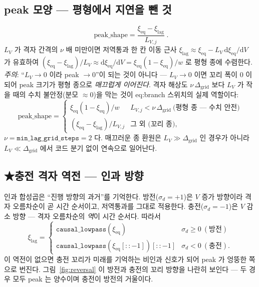 \documentclass[11pt,a4paper]{article}
\newcommand{\dd}{\mathrm{d}}
\newcommand{\eq}{\mathrm{eq}}
\newcommand{\code}[1]{\texttt{#1}}
\begin{document}
\subsection{peak 모양 — 평형에서 지연을 뺀 것}
\begin{equation}
\boxed{\;\text{peak\_shape}=\frac{\xi_{\eq}-\xi_{\mathrm{lag}}}{L_{V,j}}\;.}
\label{eq:peakshape}
\end{equation}
$L_V$ 가 격자 간격의 $\nu$ 배 미만이면 저역통과 한 칸 이동 근사
$\xi_\mathrm{lag}\approx\xi_\eq - L_V\,\dd\xi_\eq/\dd V$ 가 유효하여
$(\xi_\eq-\xi_\mathrm{lag})/L_V\approx\dd\xi_\eq/\dd V = \xi_\eq(1-\xi_\eq)/w$ 로 평형 종에 수렴한다.
\emph{주의}: ``$L_V\to0$ 이라 peak $\to0$''이 되는 것이 아니다 — $L_V\to0$ 이면 꼬리 폭이 $0$ 이 되어
peak 크기가 평형 종으로 \emph{매끄럽게 이어진다}. 격자 해상도 $\nu\,\Delta_\mathrm{grid}$ 보다
$L_V$ 가 작을 때의 수치 불안정(분모 $\approx0$)을 막는 것이 eq:branch 스위치의 실제 역할이다:
\begin{equation}
\text{peak\_shape}=
\begin{cases}
\xi_\eq(1-\xi_\eq)/w & L_{V,j}<\nu\,\Delta_\mathrm{grid}\ \text{(평형 종 — 수치 안전)}\\[2pt]
(\xi_\eq-\xi_\mathrm{lag})/L_{V,j} & \text{그 외 (꼬리 종)},
\end{cases}
\label{eq:branch}
\end{equation}
$\nu=\code{min\_lag\_grid\_steps}=2$ 다. 매끄러운 종 환원은 $L_V\gg\Delta_\mathrm{grid}$ 인 경우가 아니라
$L_V \ll \Delta_\mathrm{grid}$ 에서 코드 분기 없이 연속으로 일어난다.

\subsection{★충전 격자 역전 — 인과 방향}
인과 합성곱은 ``진행 방향의 과거''를 기억한다. 방전($\sigma_d=+1$)은 $V$ 증가 방향이라
격자 오름차순이 곧 시간 순서이고, 저역통과를 그대로 적용한다. 충전($\sigma_d=-1$)은 $V$ 감소 방향 —
격자 오름차순의 \emph{역}이 시간 순서다. 따라서
\begin{equation}
\xi_\mathrm{lag}=
\begin{cases}
\code{causal\_lowpass}(\xi_\eq) & \sigma_d\ge0\ (\text{방전})\\[2pt]
\code{causal\_lowpass}(\xi_\eq[::-1])[::-1] & \sigma_d<0\ (\text{충전}).
\end{cases}
\label{eq:reversal}
\end{equation}
이 역전이 없으면 충전 꼬리가 미래를 기억하는 비인과 신호가 되어 peak 가 엉뚱한 쪽으로 번진다.
그림~\ref{fig:reversal} 이 방전과 충전의 꼬리 방향을 나란히 보인다 — 두 경우 모두 peak 는 양수이며 충전이 방전의 거울이다.
\end{document}
